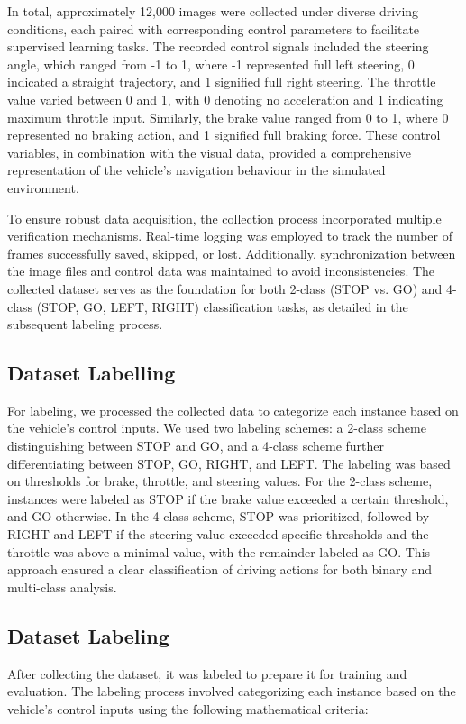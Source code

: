 In total, approximately 12,000 images were collected under diverse driving conditions, each paired with corresponding control parameters to facilitate supervised learning tasks. The recorded control signals included the steering angle, which ranged from -1 to 1, where -1 represented full left steering, 0 indicated a straight trajectory, and 1 signified full right steering. The throttle value varied between 0 and 1, with 0 denoting no acceleration and 1 indicating maximum throttle input. Similarly, the brake value ranged from 0 to 1, where 0 represented no braking action, and 1 signified full braking force. These control variables, in combination with the visual data, provided a comprehensive representation of the vehicle's navigation behaviour in the simulated environment.

To ensure robust data acquisition, the collection process incorporated multiple verification mechanisms. Real-time logging was employed to track the number of frames successfully saved, skipped, or lost. Additionally, synchronization between the image files and control data was maintained to avoid inconsistencies. The collected dataset serves as the foundation for both 2-class (STOP vs. GO) and 4-class (STOP, GO, LEFT, RIGHT) classification tasks, as detailed in the subsequent labeling process.

\subsection{Dataset Labelling}

For labeling, we processed the collected data to categorize each instance based on the vehicle's control inputs. We used two labeling schemes: a 2-class scheme distinguishing between STOP and GO, and a 4-class scheme further differentiating between STOP, GO, RIGHT, and LEFT. The labeling was based on thresholds for brake, throttle, and steering values. For the 2-class scheme, instances were labeled as STOP if the brake value exceeded a certain threshold, and GO otherwise. In the 4-class scheme, STOP was prioritized, followed by RIGHT and LEFT if the steering value exceeded specific thresholds and the throttle was above a minimal value, with the remainder labeled as GO. This approach ensured a clear classification of driving actions for both binary and multi-class analysis.

\subsection{Dataset Labeling}
After collecting the dataset, it was labeled to prepare it for training and evaluation. The labeling process involved categorizing each instance based on the vehicle's control inputs using the following mathematical criteria:

